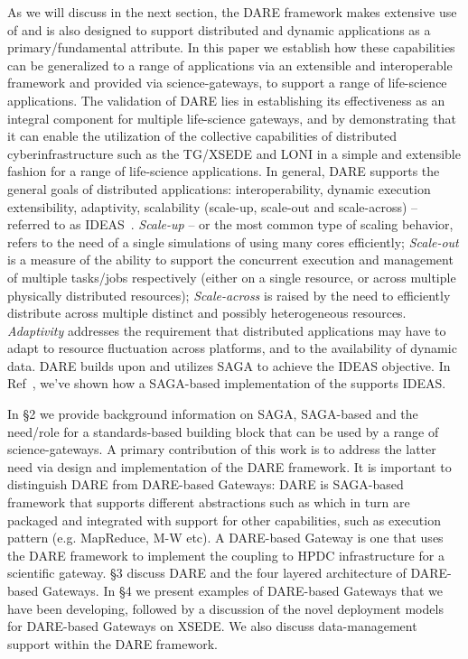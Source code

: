 \documentclass[]{svjour3}
\begin{document}
As we will discuss in the next section, the DARE framework makes
extensive use of \pilotjobs and is also designed to support
distributed and dynamic applications as a primary/fundamental
attribute.  In this paper we establish how these capabilities can be
generalized to a range of applications via an extensible and
interoperable framework and provided via science-gateways, to support
a range of life-science applications.  The validation of DARE lies in
establishing its effectiveness as an integral component for multiple
life-science gateways, and by demonstrating that it can enable the
utilization of the collective capabilities of distributed
cyberinfrastructure such as the TG/XSEDE and LONI in a simple and
extensible fashion for a range of life-science applications.  In
general, DARE supports the general goals of distributed applications:
interoperability, dynamic execution extensibility, adaptivity,
scalability (scale-up, scale-out and scale-across) -- referred to as
IDEAS~\cite{ideas}.  
{\it Scale-up} -- or the most common type of scaling behavior, refers
to the need of a single simulations of using many cores efficiently;
{\it Scale-out} is a measure of the ability to support the concurrent
execution and management of multiple tasks/jobs respectively (either
on a single resource, or across multiple physically distributed
resources); {\it Scale-across} is raised by the need to efficiently
distribute across multiple distinct and possibly heterogeneous
resources. {\it Adaptivity} addresses the requirement that distributed
applications may have to adapt to resource fluctuation across
platforms, and to the availability of dynamic data.  DARE builds upon
and utilizes SAGA to achieve the IDEAS objective. In Ref~\cite{ideas},
we've shown how a SAGA-based implementation of the \pilotjob supports
IDEAS.

In \S2 we provide background information on SAGA, SAGA-based
\pilotjobs and the need/role for a standards-based building block that
can be used by a range of science-gateways.  A primary contribution of
this work is to address the latter need via design and implementation
of the DARE framework.  It is important to distinguish DARE from
DARE-based Gateways: DARE is SAGA-based framework that supports
different abstractions such as \pilotjobs which in turn are packaged
and integrated with support for other capabilities, such as execution
pattern (e.g. MapReduce, M-W etc). A DARE-based Gateway is one that
uses the DARE framework to implement the coupling to HPDC
infrastructure for a scientific gateway.  \S3 discuss DARE and the
four layered architecture of DARE-based Gateways. In \S4 we present
examples of DARE-based Gateways that we have been developing, followed
by a discussion of the novel deployment models for DARE-based Gateways
on XSEDE. We also discuss data-management support within the DARE
framework.
\end{document}
